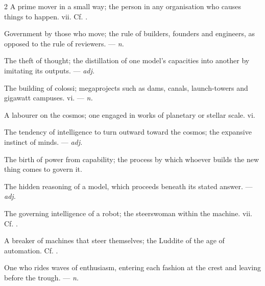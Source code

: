 \begin{multicols}{2}
 A prime mover in a small way; the person in any organisation who causes things to happen.   vii. Cf. .

 Government by those who move; the rule of builders, founders and engineers, as opposed to the rule of reviewers. —  \textit{n.}

 The theft of thought; the distillation of one model's capacities into another by imitating its outputs. —  \textit{adj.}

 The building of colossi; megaprojects such as dams, canals, launch-towers and gigawatt campuses.   vi. —  \textit{n.}

 A labourer on the cosmos; one engaged in works of planetary or stellar scale.   vi.

 The tendency of intelligence to turn outward toward the cosmos; the expansive instinct of minds. —  \textit{adj.}

 The birth of power from capability; the process by which whoever builds the new thing comes to govern it.

 The hidden reasoning of a model, which proceeds beneath its stated answer. —  \textit{adj.}

 The governing intelligence of a robot; the steerswoman within the machine.   vii. Cf. .

 A breaker of machines that steer themselves; the Luddite of the age of automation. Cf. .

 One who rides waves of enthusiasm, entering each fashion at the crest and leaving before the trough. —  \textit{n.}

\end{multicols}

